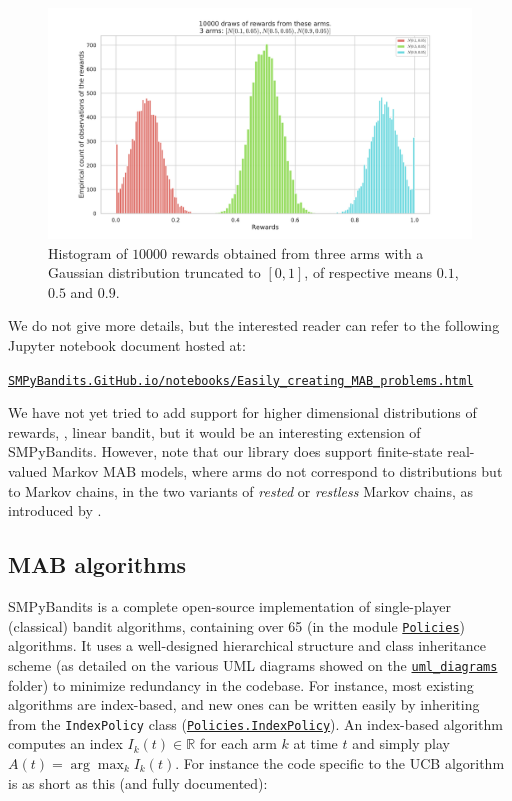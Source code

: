 \begin{figure}[h!]  %
	\centering
	\includegraphics[width=0.75\linewidth]{exampleOfRewards.pdf}
	\caption{Histogram of $10000$ \iid{} rewards obtained from three arms with a Gaussian distribution truncated to $[0,1]$, of respective means $0.1$, $0.5$ and $0.9$.}
	\label{fig:3:exampleOfRewards}
\end{figure}


We do not give more details, but the interested reader can refer to the following Jupyter notebook \cite{jupyter} document hosted at:\\
\begin{small}
    \href{https://smpybandits.github.io/notebooks/Easily_creating_MAB_problems.html}{\texttt{SMPyBandits.GitHub.io/notebooks/Easily\_creating\_MAB\_problems.html}}
\end{small}

We have not yet tried to add support for higher dimensional distributions of rewards, \eg, linear bandit, but it would be an interesting extension of SMPyBandits.
%
However, note that our library does support finite-state real-valued Markov MAB models, where arms do not correspond to distributions but to Markov chains, in the two variants of \emph{rested} or \emph{restless} Markov chains, as introduced by \cite{Anantharam87b}.

\subsection{MAB algorithms}

SMPyBandits is a complete open-source implementation of single-player (classical) bandit algorithms,
containing over 65 (in the module \texttt{\href{https://SMPyBandits.GitHub.io/docs/Policies.html}{Policies}}) algorithms.
It uses a well-designed hierarchical structure and class inheritance scheme (as detailed on the various UML diagrams showed on the \texttt{\href{https://SMPyBandits.GitHub.io/uml_diagrams/README.html}{uml\_diagrams}} folder) to minimize redundancy in the codebase.
For instance, most existing algorithms are index-based, and new ones can be written easily by inheriting from the \texttt{IndexPolicy} class (\texttt{\href{https://SMPyBandits.GitHub.io/docs/Policies.IndexPolicy.html}{Policies.IndexPolicy}}).
An index-based algorithm computes an index $I_k(t)\in\mathbb{R}$ for each arm $k$ at time $t$ and simply play $A(t) = \arg\max_k I_k(t)$.
For instance the code specific to the UCB algorithm \cite{LaiRobbins85,Auer02} is as short as this (and fully documented):

